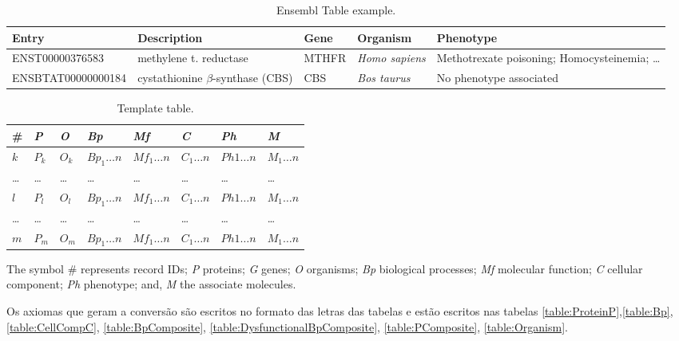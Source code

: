 \documentclass[]{scrartcl}
\begin{document}
\begin{table}[h!]
	\caption{Ensembl Table example.}
	\label{table:ensembl}
	\centering
	\begin{tabular}{p{1.1in}p{1.0in}p{0.5in}p{0.5in}p{1.2in}} \hline 
		Entry & Description & Gene & Organism & Phenotype \\ \hline 
		ENST00000376583 & methylene t. reductase & MTHFR & \textit{Homo sapiens} & Methotrexate poisoning; Homocysteinemia; \ldots \\
		ENSBTAT00000000184 & cystathionine $\beta$-synthase (CBS) & CBS & \textit{Bos taurus} & No phenotype associated \\
		\hline 
	\end{tabular}
\end{table}

\begin{table}[h!]
	\centering
	\caption{Template table.}
	\label{table:template}
	\begin{tabular}{p{0.4in}p{0.3in}p{0.3in}p{0.6in}p{0.6in}p{0.6in}p{0.6in}p{0.6in}} \hline 
		\# & \textit{P} &\textit{O} & \textit{Bp} & \textit{Mf} & \textit{C} & \textit{Ph} & \textit{M} \\ \hline 
		$k$ & $P_k$ & $O_k$ & $Bp_1\ldots n$ & $Mf_1\ldots n$ & $C_1\ldots n$ & $Ph1\ldots n$ & $M_1\ldots n$ \\
		\ldots & \ldots & \ldots & \ldots & \ldots & \ldots & \ldots & \ldots \\
		$l$ & $P_l$ & $O_l$ & $Bp_1\ldots n$ & $Mf_1\ldots n$ & $C_1\ldots n$ & $Ph1\ldots n$ & $M_1\ldots n$ \\
		\ldots & \ldots & \ldots & \ldots & \ldots & \ldots & \ldots & \ldots \\
		$m$ & $P_m$ & $O_m$ & $Bp_1\ldots n$ & $Mf_1\ldots n$ & $C_1\ldots n$ & $Ph1\ldots n$ & $M_1\ldots n$ \\ \hline 
	\end{tabular}
	\begin{tablenotes}
		\item The symbol \# represents record IDs; \textit{P} proteins; \textit{G} genes; \textit{O} organisms; \textit{Bp} biological processes;
		\textit{Mf} molecular function; \textit{C} cellular component; \textit{Ph} phenotype; and, \textit{M} the associate molecules.
	\end{tablenotes}
\end{table}

Os axiomas que geram a conversão são escritos no formato das letras das tabelas e estão escritos nas tabelas \ref{table:ProteinP},\ref{table:Bp}, \ref{table:CellCompC}, \ref{table:BpComposite}, \ref{table:DysfunctionalBpComposite}, \ref{table:PComposite}, \ref{table:Organism}.
\end{document}

